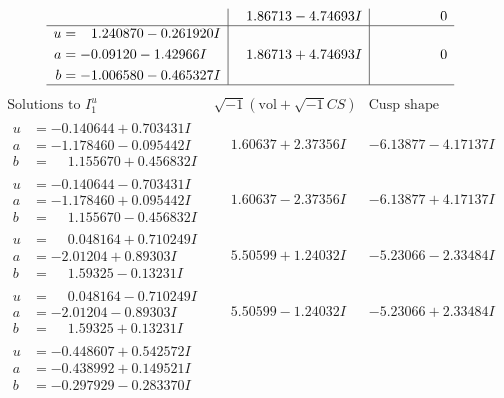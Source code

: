 \documentclass[1p]{elsarticle_modified}
\theoremstyle{definition}
\newcommand{\I}{\sqrt{-1}}
\begin{document}
$$\begin{array}{c|c|c}
 & \phantom{-}1.86713 - 4.74693 I & \phantom{-0.000000 } 0 \\ \hline\begin{aligned}
u &= \phantom{-}1.240870 - 0.261920 I \\
a &= -0.09120 - 1.42966 I \\
b &= -1.006580 - 0.465327 I\end{aligned}
 & \phantom{-}1.86713 + 4.74693 I & \phantom{-0.000000 } 0\\
 \hline 
 \end{array}$$\newpage$$\begin{array}{c|c|c}  
\text{Solutions to }I^u_{1}& \I (\text{vol} + \sqrt{-1}CS) & \text{Cusp shape}\\
 \hline 
\begin{aligned}
u &= -0.140644 + 0.703431 I \\
a &= -1.178460 - 0.095442 I \\
b &= \phantom{-}1.155670 + 0.456832 I\end{aligned}
 & \phantom{-}1.60637 + 2.37356 I & -6.13877 - 4.17137 I \\ \hline\begin{aligned}
u &= -0.140644 - 0.703431 I \\
a &= -1.178460 + 0.095442 I \\
b &= \phantom{-}1.155670 - 0.456832 I\end{aligned}
 & \phantom{-}1.60637 - 2.37356 I & -6.13877 + 4.17137 I \\ \hline\begin{aligned}
u &= \phantom{-}0.048164 + 0.710249 I \\
a &= -2.01204 + 0.89303 I \\
b &= \phantom{-}1.59325 - 0.13231 I\end{aligned}
 & \phantom{-}5.50599 + 1.24032 I & -5.23066 - 2.33484 I \\ \hline\begin{aligned}
u &= \phantom{-}0.048164 - 0.710249 I \\
a &= -2.01204 - 0.89303 I \\
b &= \phantom{-}1.59325 + 0.13231 I\end{aligned}
 & \phantom{-}5.50599 - 1.24032 I & -5.23066 + 2.33484 I \\ \hline\begin{aligned}
u &= -0.448607 + 0.542572 I \\
a &= -0.438992 + 0.149521 I \\
b &= -0.297929 - 0.283370 I\end{aligned}

\end{array}$$
\end{document}
